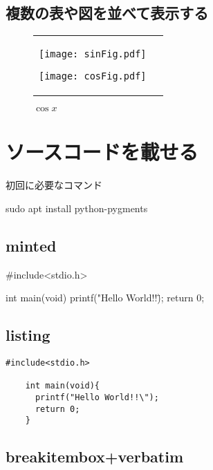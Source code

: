 \documentclass[a4j,titlepage,dvipdfmx]{jsarticle}   %
\begin{document}
  \subsection{複数の表や図を並べて表示する}
  \begin{figure}[H]
    \begin{tabular}{cc}
      \begin{minipage}{0.5\hsize}
        \centering
        \texttt{[image: sinFig.pdf]}
        \caption{$\sin{x}$}
        \label{fig:sin}
      \end{minipage}
      \begin{minipage}{0.5\hsize}
        \centering
        \texttt{[image: cosFig.pdf]}
        \caption{$\cos{x}$}
        \label{fig:cos}
      \end{minipage}
    \end{tabular}
  \end{figure}
  \section{ソースコードを載せる}
  \begin{listing}[htbp]
    \caption{初回に必要なコマンド}
    \begin{shellcode}
      sudo apt install python-pygments
    \end{shellcode}
  \end{listing}
  \subsection{minted}
  \begin{myMinted}
    #include<stdio.h>

    int main(void){
      printf("Hello World!!\");
      return 0;
    }
  \end{myMinted}

  \subsection{listing}
  \begin{lstlisting}[caption=listingのテスト,label=listTest]
    #include<stdio.h>

    int main(void){
      printf("Hello World!!\");
      return 0;
    }
  \end{lstlisting}

  \subsection{breakitembox+verbatim}
\end{document}
